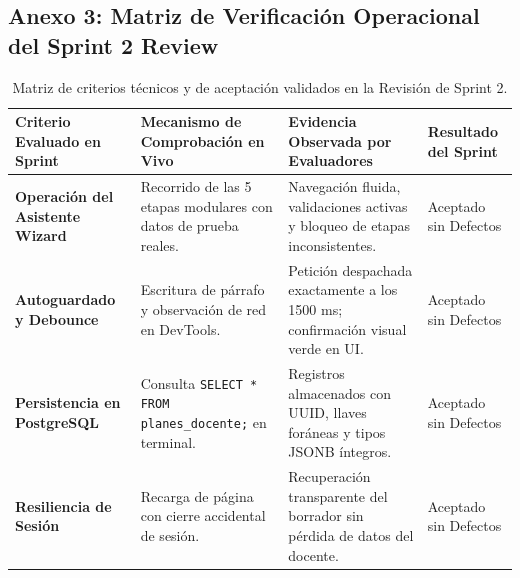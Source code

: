 \documentclass[12pt,a4paper]{article}
\begin{document}
\subsection*{Anexo 3: Matriz de Verificación Operacional del Sprint 2 Review}
\begin{table}[H]
\centering
\small
\renewcommand{\arraystretch}{1.15}
\begin{tabularx}{\textwidth}{|>{\hsize=0.75\hsize\raggedright\arraybackslash\bfseries\footnotesize}X|>{\hsize=1.25\hsize\raggedright\arraybackslash\footnotesize}X|>{\hsize=1.35\hsize\raggedright\arraybackslash\footnotesize}X|>{\hsize=0.65\hsize\centering\arraybackslash\footnotesize}X|}
\hline
\rowcolor{tableheader}
\textbf{Criterio Evaluado en Sprint} & \textbf{Mecanismo de Comprobación en Vivo} & \textbf{Evidencia Observada por Evaluadores} & \textbf{Resultado del Sprint} \\
\hline
Operación del Asistente Wizard & Recorrido de las 5 etapas modulares con datos de prueba reales. & Navegación fluida, validaciones activas y bloqueo de etapas inconsistentes. & Aceptado sin Defectos \\
\hline
Autoguardado y Debounce & Escritura de párrafo y observación de red en DevTools. & Petición despachada exactamente a los 1500 ms; confirmación visual verde en UI. & Aceptado sin Defectos \\
\hline
Persistencia en PostgreSQL & Consulta \texttt{SELECT * FROM planes\_\allowbreak  docente;} en terminal. & Registros almacenados con UUID, llaves foráneas y tipos JSONB íntegros. & Aceptado sin Defectos \\
\hline
Resiliencia de Sesión & Recarga de página con cierre accidental de sesión. & Recuperación transparente del borrador sin pérdida de datos del docente. & Aceptado sin Defectos \\
\hline
\end{tabularx}
\caption{Matriz de criterios técnicos y de aceptación validados en la Revisión de Sprint 2.}
\end{table}
\end{document}

